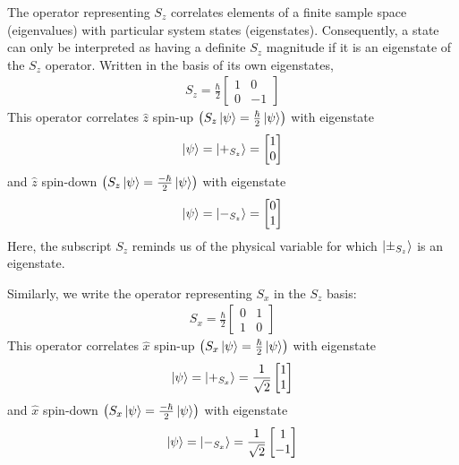 The operator representing $S_z$ correlates elements of a finite sample space (eigenvalues) with particular system states (eigenstates). Consequently, a state can only be interpreted as having a definite $S_z$ magnitude if it is an eigenstate of the $S_z$ operator. Written in the basis of its own eigenstates,
\begin{align}
    S_z = \frac{\hbar}{2}\begin{bmatrix} 1 & 0 \\ 0 & -1 \end{bmatrix}
\end{align}
This operator correlates $\hat{z}$ spin-up $\left(S_z \ket{\psi} = \frac{\hbar}{2}\ket{\psi}\right)$ with eigenstate
\begin{align}
    \ket{\psi} = \ket{+_{S_z}} = \begin{bmatrix} 1 \\ 0 \end{bmatrix}
\end{align}
and $\hat{z}$ spin-down $\left(S_z \ket{\psi} = \frac{-\hbar}{2}\ket{\psi}\right)$ with eigenstate
\begin{align}
    \ket{\psi} = \ket{-_{S_z}} = \begin{bmatrix} 0 \\ 1 \end{bmatrix}
\end{align}
Here, the subscript $S_z$ reminds us of the physical variable for which $\ket{\pm_{S_z}}$ is an eigenstate.

Similarly, we write the operator representing $S_x$ in the $S_z$ basis:
\begin{align}
    S_x = \frac{\hbar}{2}\begin{bmatrix} 0 & 1 \\ 1 & 0 \end{bmatrix}
\end{align}
This operator correlates $\hat{x}$ spin-up $\left(S_x \ket{\psi} = \frac{\hbar}{2} \ket{\psi}\right)$ with eigenstate
\begin{align}
    \ket{\psi} = \ket{+_{S_x}} = \frac{1}{\sqrt{2}}\begin{bmatrix} 1 \\ 1 \end{bmatrix}
\end{align}
and $\hat{x}$ spin-down $\left(S_x \ket{\psi} = \frac{-\hbar}{2} \ket{\psi}\right)$ with eigenstate
\begin{align}
    \ket{\psi} = \ket{-_{S_x}} = \frac{1}{\sqrt{2}}\begin{bmatrix} 1 \\ -1 \end{bmatrix}
\end{align}

